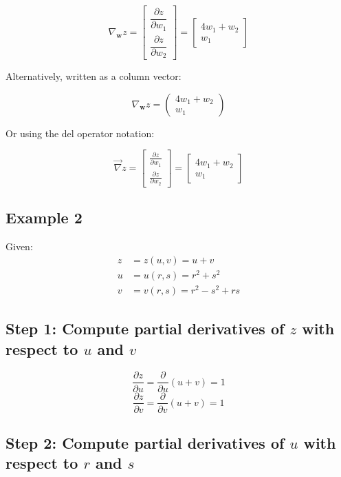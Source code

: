 \documentclass{tufte-handout}
\begin{document}
\[
\nabla_{\mathbf{w}} z = \begin{bmatrix} 
\dfrac{\partial z}{\partial w_1} \\[1em]
\dfrac{\partial z}{\partial w_2}
\end{bmatrix} = \begin{bmatrix}
4w_1 + w_2 \\
w_1
\end{bmatrix}
\]

Alternatively, written as a column vector:

\[
\nabla_{\mathbf{w}} z = \begin{pmatrix} 
4w_1 + w_2 \\
w_1
\end{pmatrix}
\]

Or using the del operator notation:

\[
\vec{\nabla} z = \begin{bmatrix} 
\frac{\partial z}{\partial w_1} \\
\frac{\partial z}{\partial w_2}
\end{bmatrix} = \begin{bmatrix}
4w_1 + w_2 \\
w_1
\end{bmatrix}
\]

\subsection{Example 2}

Given:
\begin{align*}
z &= z(u, v) = u + v \\
u &= u(r, s) = r^2 + s^2 \\
v &= v(r, s) = r^2 - s^2 + rs
\end{align*}

\subsection*{Step 1: Compute partial derivatives of $z$ with respect to $u$ and $v$}

\[
\frac{\partial z}{\partial u} = \frac{\partial}{\partial u}(u + v) = 1
\]
\[
\frac{\partial z}{\partial v} = \frac{\partial}{\partial v}(u + v) = 1
\]

\subsection*{Step 2: Compute partial derivatives of $u$ with respect to $r$ and $s$}
\end{document}
